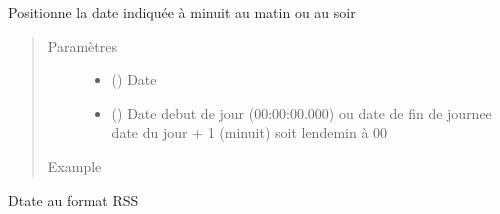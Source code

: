 \documentclass[letterpaper,10pt,french]{sphinxmanual}
\begin{document}

\begin{fulllineitems}
\label{\detokenize{modules/dtemng:toolbox.dtemng.date_dayed}}
Positionne la date indiquée à minuit au matin ou au soir
\begin{quote}\begin{description}
\item[{Paramètres}] \leavevmode\begin{itemize}
\item {} 
 () \textendash{} Date

\item {} 
 () \textendash{} Date debut de jour (00:00:00.000) ou date de fin de journee date du jour + 1 (minuit) soit lendemin à 00

\end{itemize}

\item[{Example}] \leavevmode
\begin{sphinxVerbatim}[commandchars=\\\{\}]
\end{sphinxVerbatim}

\end{description}\end{quote}

\end{fulllineitems}


\begin{fulllineitems}
\label{\detokenize{modules/dtemng:toolbox.dtemng.date_rss}}
Dtate au format RSS

\end{fulllineitems}
\end{document}
